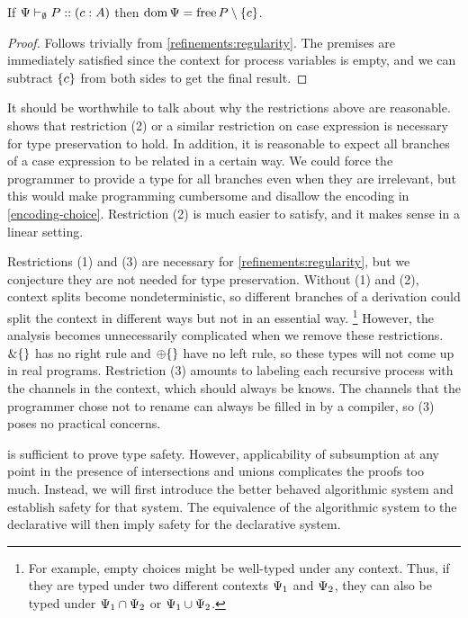 \begin{corollary}
  \label{refinements:regularity-corollary}
  If ${\Psi} \vdash_{\emptyset} P :: (c : A)$ then $\operatorname{dom}\Psi = \operatorname{free} P \setminus {\lbrace c\rbrace}$.
\end{corollary}
\begin{proof}
  Follows trivially from \cref{refinements:regularity}. The premises are immediately satisfied since the context for process variables is empty, and we can subtract $\lbrace c\rbrace$ from both sides to get the final result.
\end{proof}

It should be worthwhile to talk about why the restrictions above are reasonable.  shows that restriction (2) or a similar restriction on case expression is necessary for type preservation to hold. In addition, it is reasonable to expect all branches of a case expression to be related in a certain way. We could force the programmer to provide a type for all branches even when they are irrelevant, but this would make programming cumbersome and disallow the encoding in \cref{encoding-choice}. Restriction (2) is much easier to satisfy, and it makes sense in a linear setting.

Restrictions (1) and (3) are necessary for \cref{refinements:regularity}, but we conjecture they are not needed for type preservation. Without (1) and (2), context splits become nondeterministic, so different branches of a derivation could split the context in different ways but not in an essential way.%
\footnote{For example, empty choices might be well-typed under any context. Thus, if they are typed under two different contexts $\Psi_1$ and $\Psi_2$, they can also be typed under $\Psi_1 \cap \Psi_2$ or $\Psi_1 \cup \Psi_2$.}
However, the analysis becomes unnecessarily complicated when we remove these restrictions. $\&\lbrace\rbrace$ has no right rule and $\oplus\lbrace\rbrace$ have no left rule, so these types will not come up in real programs. Restriction (3) amounts to labeling each recursive process with the channels in the context, which should always be knows. The channels that the programmer chose not to rename can always be filled in by a compiler, so (3) poses no practical concerns.


 is sufficient to prove type safety. However, applicability of subsumption at any point in the presence of intersections and unions complicates the proofs too much. Instead, we will first introduce the better behaved algorithmic system and establish safety for that system. The equivalence of the algorithmic system to the declarative will then imply safety for the declarative system.


